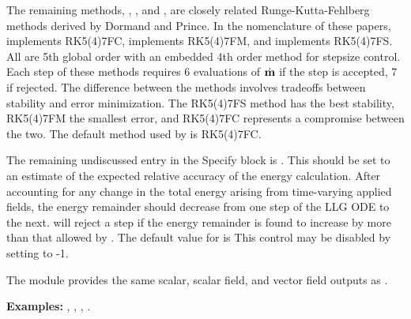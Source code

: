 \begin{description}
The remaining methods, ,  ,
and , are closely related Runge-Kutta-Fehlberg methods
derived by Dormand and Prince\cite{dormand80,dormand86}.  In the
nomenclature of these papers,
 implements RK5(4)7FC,
 implements RK5(4)7FM, and
 implements RK5(4)7FS.
All are 5th global order with an embedded 4th order method for stepsize
control.  Each step of these methods requires 6 evaluations of
$\dot{\textbf{m}}$ if the step is accepted, 7 if rejected.  The difference
between the methods involves tradeoffs between stability and error
minimization.  The RK5(4)7FS method has the best stability, RK5(4)7FM
the smallest error, and RK5(4)7FC represents a compromise between the
two.  The default method used by  is
RK5(4)7FC.

\label{html:oxsrkeprecision}
The remaining undiscussed entry in the 
Specify block is .  This should be set to an
estimate of the expected relative accuracy of the energy calculation.
After accounting for any change in the total energy arising from
time-varying applied fields, the energy remainder should decrease from
one step of the LLG ODE to the next.   will
reject a step if the energy remainder is found to increase by more than
that allowed by .  The default value for
 is   This control
may be disabled by setting  to -1.

The  module provides the same scalar, scalar
field, and vector field outputs as .

\textbf{Examples:} , ,
                   , .


\end{description}
